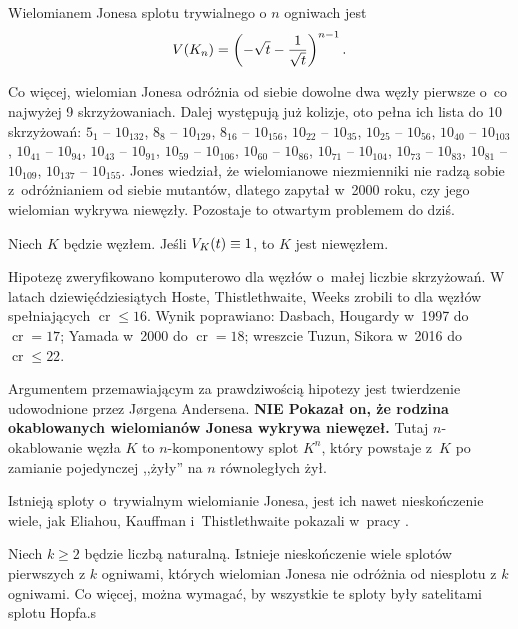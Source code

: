 \begin{proposition}
\label{prp:jones_trivial_link}
    Wielomianem Jonesa splotu trywialnego o $n$ ogniwach jest
    \begin{equation}
        V(K_n) = \left(-\sqrt{t} - \frac{1}{\sqrt {t}}\right)^{n-1}.
    \end{equation}
\end{proposition}

Co więcej, wielomian Jonesa odróżnia od siebie dowolne dwa węzły pierwsze o~co najwyżej 9 skrzyżowaniach.
Dalej występują już kolizje, oto pełna ich lista do 10 skrzyżowań:
$5_{1}$ -- $10_{132}$,
$8_{8}$ -- $10_{129}$,
$8_{16}$ -- $10_{156}$,
$10_{22}$ -- $10_{35}$,
$10_{25}$ -- $10_{56}$,
$10_{40}$ -- $10_{103}$,
$10_{41}$ -- $10_{94}$,
$10_{43}$ -- $10_{91}$,
$10_{59}$ -- $10_{106}$,
$10_{60}$ -- $10_{86}$,
$10_{71}$ -- $10_{104}$,
$10_{73}$ -- $10_{83}$,
$10_{81}$ -- $10_{109}$,
$10_{137}$ -- $10_{155}$.
Jones wiedział, że wielomianowe niezmienniki nie radzą sobie z~odróżnianiem od siebie mutantów, dlatego zapytał w~2000 roku, czy jego wielomian wykrywa niewęzły.
Pozostaje to otwartym problemem do dziś.

\begin{conjecture} \label{jones_conjecture}
    Niech $K$ będzie węzłem.
    Jeśli $V_K(t) \equiv 1$, to $K$ jest niewęzłem.
\end{conjecture}

Hipotezę zweryfikowano komputerowo dla węzłów o~małej liczbie skrzyżowań.
W latach dziewięćdziesiątych Hoste, Thistlethwaite, Weeks zrobili to dla węzłów spełniających $\operatorname{cr} \le 16$.
Wynik poprawiano: Dasbach, Hougardy w~1997 do $\operatorname{cr} = 17$; Yamada w~2000 do $\operatorname{cr} = 18$; wreszcie Tuzun, Sikora w~2016 do $\operatorname{cr} \le 22$.

Argumentem przemawiającym za prawdziwością hipotezy jest twierdzenie udowodnione przez Jørgena Andersena.
\textbf{NIE Pokazał on, że rodzina okablowanych wielomianów Jonesa wykrywa niewęzeł.}
Tutaj $n$-okablowanie węzła $K$ to $n$-komponentowy splot $K^n$, który powstaje z~$K$ po zamianie pojedynczej ,,żyły'' na $n$ równoległych żył.

Istnieją sploty o~trywialnym wielomianie Jonesa, jest ich nawet nieskończenie wiele, jak Eliahou, Kauffman i~Thistlethwaite pokazali w~pracy \cite{eliahou03}.

\begin{proposition}
    Niech $k \ge 2$ będzie liczbą naturalną.
    Istnieje nieskończenie wiele splotów pierwszych z $k$ ogniwami, których wielomian Jonesa nie odróżnia od niesplotu z $k$ ogniwami.
    Co więcej, można wymagać, by wszystkie te sploty były satelitami splotu Hopfa.s
\end{proposition}

